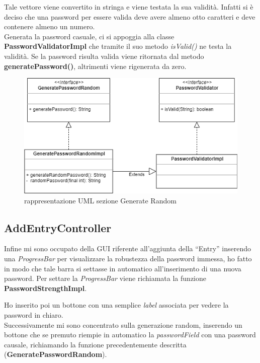 \documentclass[a4paper,12pt]{report}
\begin{document}
Tale vettore viene convertito in stringa e viene testata la sua validità. Infatti si è deciso che una password per essere valida deve avere almeno otto caratteri e deve contenere almeno un numero.\\

Generata la password casuale, ci si appoggia alla classe \textbf{PasswordValidatorImpl} che tramite il suo metodo \textit{isValid()} ne testa la validità.
Se la password risulta valida viene ritornata dal metodo \textbf{generatePassword()}, altrimenti viene rigenerata da zero.

\begin{figure}[h]
\centering{}
\includegraphics[width=\textwidth]{password-generate}
\caption{rappresentazione UML sezione Generate Random}
\end{figure}

\subsection*{AddEntryController}
Infine mi sono occupato della GUI riferente all’aggiunta della “Entry” inserendo una \textit{ProgressBar} per visualizzare la robustezza della password immessa, ho fatto in modo che tale barra si settasse in automatico all’inserimento di una nuova password. Per settare la \textit{ProgressBar} viene richiamata la funzione \textbf{PasswordStrengthImpl}.

Ho inserito poi un bottone con una semplice \textit{label} associata per vedere la password in chiaro.\\

Successivamente mi sono concentrato sulla generazione random, inserendo un bottone che se premuto riempie in automatico la \textit{passwordField} con una password causale, richiamando la funzione precedentemente descritta (\textbf{GeneratePasswordRandom}).
\end{document}
